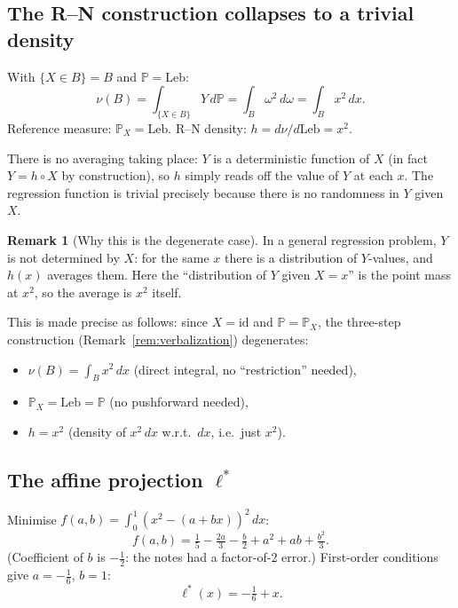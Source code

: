 \documentclass[12pt, a4paper]{article}
\theoremstyle{definition}
\newtheorem{remark}{Remark}[section]
\newcommand{\Prob}{\mathbb{P}}
\newcommand{\Leb}{\mathrm{Leb}}
\begin{document}
\subsection{The R--N construction collapses to a trivial density}

With $\{X\in B\}=B$ and $\Prob=\Leb$:
\[
  \nu(B) = \int_{\{X\in B\}} Y\,d\Prob
         = \int_B \omega^2\,d\omega
         = \int_B x^2\,dx.
\]
Reference measure: $\Prob_X=\Leb$.
R--N density: $h = d\nu/d\Leb = x^2$.

There is no averaging taking place: $Y$ is a deterministic function
of $X$ (in fact $Y=h\circ X$ by construction), so $h$ simply reads
off the value of $Y$ at each $x$.  The regression function is
trivial precisely because there is no randomness in $Y$ given $X$.

\begin{remark}[Why this is the degenerate case]
In a general regression problem, $Y$ is not determined by $X$:
for the same $x$ there is a distribution of $Y$-values, and $h(x)$
averages them.  Here the ``distribution of $Y$ given $X=x$'' is the
point mass at $x^2$, so the average is $x^2$ itself.

This is made precise as follows: since $X=\mathrm{id}$ and
$\Prob=\Prob_X$, the three-step construction (Remark~\ref{rem:verbalization})
degenerates:
\begin{itemize}
  \item $\nu(B)=\int_B x^2\,dx$ (direct integral, no ``restriction'' needed),
  \item $\Prob_X=\Leb=\Prob$ (no pushforward needed),
  \item $h=x^2$ (density of $x^2\,dx$ w.r.t.\ $dx$, i.e.\ just $x^2$).
\end{itemize}
\end{remark}

\subsection{The affine projection $\ell^*$}

Minimise $f(a,b)=\int_0^1(x^2-(a+bx))^2\,dx$:
\[
  f(a,b)
  =\tfrac{1}{5}-\tfrac{2a}{3}-\tfrac{b}{2}+a^2+ab+\tfrac{b^2}{3}.
\]
(Coefficient of $b$ is $-\tfrac{1}{2}$: the notes had a
factor-of-2 error.)
First-order conditions give $a=-\tfrac{1}{6}$, $b=1$:
\[
  \boxed{\ell^*(x) = -\tfrac{1}{6}+x.}
\]
\end{document}
